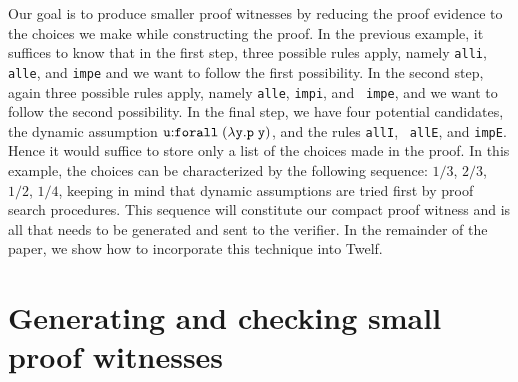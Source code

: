 \documentclass{llncs}
\newcommand{\forallLF}{\tt{forall}\;}
\begin{document}
Our goal is to produce smaller proof witnesses by reducing the proof
evidence to the choices we make while constructing the proof.  In the
previous example, it suffices to know that in the first step, three
possible rules apply, namely {\tt alli}, {\tt alle}, and {\tt impe}
and we want to follow the first possibility. In the second step, again
three possible rules apply, namely {\tt alle}, {\tt impi}, and {\tt
impe}, and we want to follow the second possibility. In the final
step, we have four potential candidates, the dynamic assumption ${\tt
u}{:} \forallLF (\lambda y. p\; y)$, and the rules {\tt allI}, {\tt
allE}, and {\tt impE}.  Hence it would suffice to store only a list of
the choices made in the proof. In this example, the choices can be
characterized by the following sequence: $1/3$, $2/3$, $1/2$, $1/4$,
keeping in mind that dynamic assumptions are tried first by proof
search procedures. This sequence will constitute our compact proof
witness and is all that needs to be generated and sent to the
verifier. In the remainder of the paper, we show how to incorporate
this technique into Twelf.

\section{Generating and checking small proof witnesses}
\label{sec:oracles}

\end{document}
